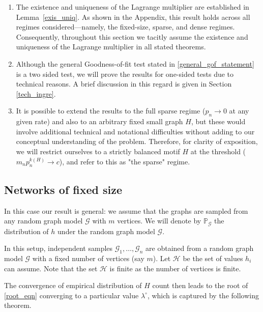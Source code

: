 \documentclass[12pt]{article}
\numberwithin{equation}{section}
\begin{document}
\begin{enumerate}
\item The existence and uniqueness of the Lagrange multiplier are established in
Lemma~\ref{exis_uniq}. As shown in the Appendix, this result holds 
across all regimes considered—namely, the fixed-size, sparse, and dense regimes.
Consequently, throughout this section we tacitly assume the existence and
uniqueness of the Lagrange multiplier in all stated theorems.

\item Although the general Goodness-of-fit test stated in \ref{general_gof_statement} is a two sided test, we will prove the results for one-sided tests due to technical reasons. A brief discussion in this regard is given in Section \ref{tech_ingre}.

\item It is possible to extend the results to the full sparse regime (\(p_n\rightarrow 0\) at any given rate) and also to an arbitrary fixed small graph \(H\), but these would involve additional technical and notational difficulties without adding to our conceptual understanding of the problem. Therefore, for clarity of exposition, we will restrict ourselves to a strictly balanced motif $H$ at the threshold (\(m_np_n^{k(H)}\rightarrow c\)), and refer to this as "the sparse" regime.

\end{enumerate}

\subsection{Networks of fixed size}

In this case our result is general: we assume that the graphs are sampled from any random graph model $\mathcal{G}$ with $m$ vertices. We will denote by $\mathbb{P}_{\mathcal{G}}$ the distribution of $h$ under the random graph model $\mathcal{G}$. 

In this setup, independent samples $\mathcal{G}_{1}, \ldots, \mathcal{G}_{n}$ are obtained from a random graph model $\mathcal{G}$ with a fixed number of vertices (say $m$). Let $\mathcal{H}$ be the set of values $h_i$ can assume. Note that the set $\mathcal{H}$ is finite as the number of vertices is finite.

The convergence of empirical distribution of \(H\) count then leads to the root of \eqref{root_eqn} converging to a particular value $\lambda^{\circ}$, which is captured by the following theorem.
\end{document}
